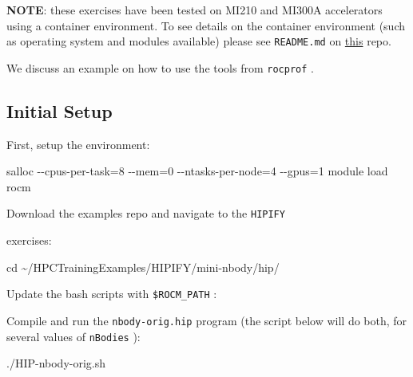 \documentclass[
]{article}
\let\oldtexttt\texttt
\renewcommand{\texttt}[1]{
  \colorbox{Light}{\oldtexttt{#1}}
}
\newenvironment{Shaded}{}{}
\newcommand{\BuiltInTok}[1]{#1}
\newcommand{\ExtensionTok}[1]{#1}
\newcommand{\FunctionTok}[1]{\textcolor[rgb]{0.02,0.16,0.49}{#1}}
\newcommand{\NormalTok}[1]{#1}
\newcommand{\StringTok}[1]{\textcolor[rgb]{0.25,0.44,0.63}{#1}}
\begin{document}
\textbf{NOTE}: these exercises have been tested on MI210 and MI300A
accelerators using a container environment. To see details on the
container environment (such as operating system and modules available)
please see \texttt{README.md} on
\href{https://github.com/amd/HPCTrainingDock}{this} repo.

We discuss an example on how to use the tools from \texttt{rocprof}.

\hypertarget{initial-setup}{%
\subsection{Initial Setup}\label{initial-setup}}

First, setup the environment:

\begin{Shaded}
\begin{Highlighting}[]
\ExtensionTok{salloc}\NormalTok{ {-}{-}cpus{-}per{-}task=8 {-}{-}mem=0 {-}{-}ntasks{-}per{-}node=4 {-}{-}gpus=1}
\ExtensionTok{module}\NormalTok{ load rocm}
\end{Highlighting}
\end{Shaded}

Download the examples repo and navigate to the \texttt{HIPIFY}
exercises:

\begin{Shaded}
\begin{Highlighting}[]
\BuiltInTok{cd}\NormalTok{ \textasciitilde{}/HPCTrainingExamples/HIPIFY/mini{-}nbody/hip/}
\end{Highlighting}
\end{Shaded}

Update the bash scripts with \texttt{\$ROCM\_PATH}:

\begin{Shaded}
\end{Shaded}

Compile and run the \texttt{nbody-orig.hip} program (the script below
will do both, for several values of \texttt{nBodies}):

\begin{Shaded}
\begin{Highlighting}[]
\ExtensionTok{./HIP{-}nbody{-}orig.sh}
\end{Highlighting}
\end{Shaded}
\end{document}
